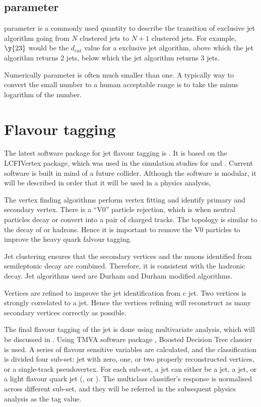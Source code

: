 \subsection{\y{} parameter}
\y{} parameter is a commonly used quantity to describe the transition of exclusive jet algorithm going from $N$ clustered jets to $N\!+\!1$ clustered jets. For example, $\y{23}$ would be the $d_{cut}$ value for a exclusive jet algorithm, above which the jet algorithm returns 2 jets, below which the jet algorithm returns 3 jets.

Numerically \y{} parameter is often much smaller than one. A typically way to convert the small number to a human acceptable range is to take the minus logarithm of the number.

\section{Flavour tagging}
\label{sec:theoryFalvourTagging}

The latest software package for jet flavour tagging is \lcfiplus \cite{Suehara:2015ura}. It is based on the LCFIVertex package, which was used in the simulation studies for \ILCloi \cite{Abe:2010aa,Aihara:2009ad} and \CLICcdr \cite{Linssen:2012hp}. Current software is built in mind of a future \ee collider. Although the software is modular, it will be described in order that it will be used in a physics analysis,

The vertex finding algorithms perform vertex fitting and identify primary and secondary vertex. There is a ``V0'' particle rejection, which is when neutral particles decay or convert into a pair of charged tracks. The topology is similar to the decay of \Pbottom or \Pcharm hadrons. Hence it is important to remove the V0 particles to improve the heavy quark falvour tagging.

Jet clustering ensures that the secondary vertices and the muons identified from semileptonic decay are combined. Therefore, it is consistent with the hadronic decay. Jet algorithms used are Durham and Durham modified algorithms.

Vertices are refined to improve the \Pbottom jet identification from c jet. Two vertices is strongly correlated to a \Pbottom jet. Hence the vertices refining will reconstruct as many secondary vertices correctly as possible.

The final flavour tagging of the jet is done using multivariate analysis, which will be discussed in . Using TMVA software package \cite{Hocker:2007ht}, Boosted Decision Tree classier is used. A series of flavour sensitive variables are calculated, and the classification is divided four sub-set: jet with zero, one, or two properly reconstructed vertices, or a single-track pseudovertex. For each sub-set, a jet can either be a \Pbottom jet, a \Pcharm jet, or a light flavour quark jet (\Pup, \Pdown or \Pstrange). The multiclass classifier's response is normalised across different sub-set, and they will be referred in the subsequent physics analysis as the tag value.

